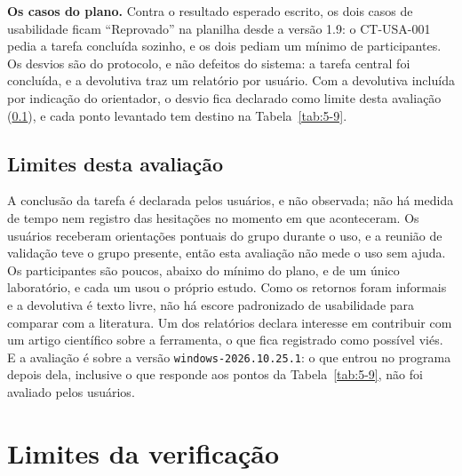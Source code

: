 \textbf{Os casos do plano.} Contra o resultado esperado escrito, os dois casos de usabilidade ficam ``Reprovado'' na planilha desde a versão 1.9: o CT-USA-001 pedia a tarefa concluída sozinho, e os dois pediam um mínimo de participantes. Os desvios são do protocolo, e não defeitos do sistema: a tarefa central foi concluída, e a devolutiva traz um relatório por usuário. Com a devolutiva incluída por indicação do orientador, o desvio fica declarado como limite desta avaliação (\ref{sec:5-4-5}), e cada ponto levantado tem destino na Tabela~\ref{tab:5-9}.

\subsection{Limites desta avaliação}\label{sec:5-4-5}

A conclusão da tarefa é declarada pelos usuários, e não observada; não há medida de tempo nem registro das hesitações no momento em que aconteceram. Os usuários receberam orientações pontuais do grupo durante o uso, e a reunião de validação teve o grupo presente, então esta avaliação não mede o uso sem ajuda. Os participantes são poucos, abaixo do mínimo do plano, e de um único laboratório, e cada um usou o próprio estudo. Como os retornos foram informais e a devolutiva é texto livre, não há escore padronizado de usabilidade para comparar com a literatura. Um dos relatórios declara interesse em contribuir com um artigo científico sobre a ferramenta, o que fica registrado como possível viés. E a avaliação é sobre a versão \texttt{windows-\allowbreak{}2026.\allowbreak{}10.\allowbreak{}25.\allowbreak{}1}: o que entrou no programa depois dela, inclusive o que responde aos pontos da Tabela~\ref{tab:5-9}, não foi avaliado pelos usuários.

\section{Limites da verificação}\label{sec:5-5}

